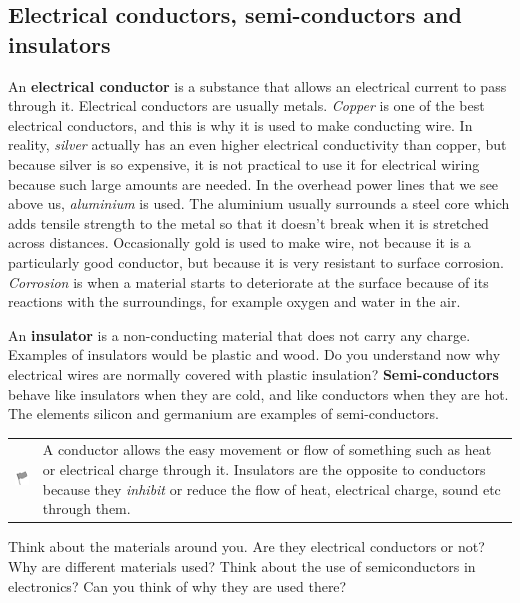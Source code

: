             \subsection{ Electrical conductors, semi-conductors and insulators}
            \nopagebreak
            \label{m38706*id66058}An \textbf{electrical conductor} is a substance that allows an electrical current to pass through it. Electrical conductors are usually metals. \textsl{Copper} is one of the best electrical conductors, and this is why it is used to make conducting wire. In reality, \textsl{silver} actually has an even higher electrical conductivity than copper, but because silver is so expensive, it is not practical to use it for electrical wiring because such large amounts are needed. In the overhead power lines that we see above us, \textsl{aluminium} is used. The aluminium usually surrounds a steel core which adds tensile strength to the metal so that it doesn't break when it is stretched across distances. Occasionally gold is used to make wire, not because it is a particularly good conductor, but because it is very resistant to surface corrosion. \textsl{Corrosion} is when a material starts to deteriorate at the surface because of its reactions with the surroundings, for example oxygen and water in the air.\par 
      \label{m38706*id66098}An \textbf{insulator} is a non-conducting material that does not carry any charge. Examples of insulators would be plastic and wood. Do you understand now why electrical wires are normally covered with plastic insulation? \textbf{Semi-conductors} behave like insulators when they are cold, and like conductors when they are hot. The elements silicon and germanium are examples of semi-conductors.\par 
\label{m38706*fhsst!!!underscore!!!id354}\begin{definition}
	  \begin{tabular*}{15 cm}{m{15 mm}m{}}
	\hspace*{-50pt}  \includegraphics[width=0.5in]{col11305.imgs/psflag2.png}   & \Definition{   \label{id2409398}\textbf{ Conductors and insulators }} { \label{m38706*meaningfhsst!!!underscore!!!id354}
      \label{m38706*id66124}A conductor allows the easy movement or flow of something such as heat or electrical charge through it. Insulators are the opposite to conductors because they \textsl{inhibit} or reduce the flow of heat, electrical charge, sound etc through them. \par 
       } 
      \end{tabular*}
      \end{definition}
\label{m38706*id0522}Think about the materials around you. Are they electrical conductors or not? Why are different materials used? Think about the use of semiconductors in electronics? Can you think of why they are used there?\par 
\label{m38706*secfhsst!!!underscore!!!id357}
